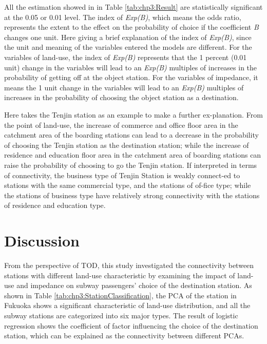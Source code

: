 %
All the estimation showed in in Table \ref{tab:chp3:Result} are statistically significant at the 0.05 or 0.01 level. The index of \textsl{Exp(B)}, which means the odds ratio, represents the extent to the effect on the probability of choice if the coefficient \textsl{B} changes one unit. Here giving a brief explanation of the index of \textsl{Exp(B)}, since the unit and meaning of the variables entered the models are different. For the variables of land-use, the index of \textsl{Exp(B)} represents that the 1 percent (0.01 unit) change in the variables will lead to an \textsl{Exp(B)} multiples of increases in the probability of getting off at the object station. For the variables of impedance, it means the 1 unit change in the variables will lead to an \textsl{Exp(B)} multiples of increases in the probability of choosing the object station as a destination. 

%
Here takes the Tenjin station as an example to make a further ex-planation. From the point of land-use, the increase of commerce and office floor area in the catchment area of the boarding stations can lead to a decrease in the probability of choosing the Tenjin station as the destination station; while the increase of residence and education floor area in the catchment area of boarding stations can raise the probability of choosing to go the Tenjin station. If interpreted in terms of connectivity, the business type of Tenjin Station is weakly connect-ed to stations with the same commercial type, and the stations of of-fice type; while the stations of business type have relatively strong connectivity with the stations of residence and education type.

%
\section{Discussion}
%
From the perspective of TOD, this study investigated the connectivity between stations with different land-use characteristic by examining the impact of land-use and impedance on subway passengers' choice of the destination station. As shown in Table \ref{tab:chp3:StationClassification}, the PCA of the station in Fukuoka shows a significant characteristic of land-use distribution, and all the subway stations are categorized into six major types. The result of logistic regression shows the coefficient of factor influencing the choice of the destination station, which can be explained as the connectivity between different PCAs.

